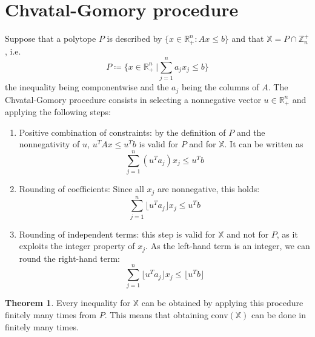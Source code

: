 \documentclass[11pt, openany]{report}
\newcommand{\R}{\mathbb{R}}
\theoremstyle{definition}
\newtheorem{thm}{Theorem}[chapter]
\begin{document}
\section{Chvatal-Gomory procedure}
Suppose that a polytope $P$ is described by $\{x\in \R_+^n:Ax\le b\}$ and that $\mathbb{X}=P\cap \mathbb{Z}_n^+$, i.e.
\begin{equation}
    P\coloneqq \{x\in \R^n_+\:|\sum_{j=1}^n a_jx_j\le b\}
\end{equation}
the inequality being componentwise and the $a_j$ being the columns of $A$. The Chvatal-Gomory procedure consists in selecting a nonnegative vector $u\in \R_+^n$ and applying the following steps:
\begin{enumerate}
    \item Positive combination of constraints: by the definition of $P$ and the nonnegativity of $u$, $u^TAx\le u^Tb$ is valid for $P$ and for $\mathbb{X}$. It can be written as 
    \begin{equation}
        \sum_{j=1}^n (u^Ta_j)x_j\le u^Tb
    \end{equation}
    \item Rounding of coefficients: Since all $x_j$ are nonnegative, this holds:
    \begin{equation}
        \sum_{j=1}^n \lfloor u^Ta_j\rfloor x_j \le u^Tb
    \end{equation}
    \item Rounding of independent terms: this step is valid for $\mathbb{X}$ and not for $P$, as it exploits the integer property of $x_j$. As the left-hand term is an integer, we can round the right-hand term:
    \begin{equation}
        \sum_{j=1}^n \lfloor u^Ta_j\rfloor x_j \le \lfloor u^Tb\rfloor 
    \end{equation}
\end{enumerate}
\begin{thm}
    Every inequality for $\mathbb{X}$ can be obtained by applying this procedure finitely many times from $P$. This means that obtaining conv$(\mathbb{X})$ can be done in finitely many times. 
\end{thm}
\end{document}
